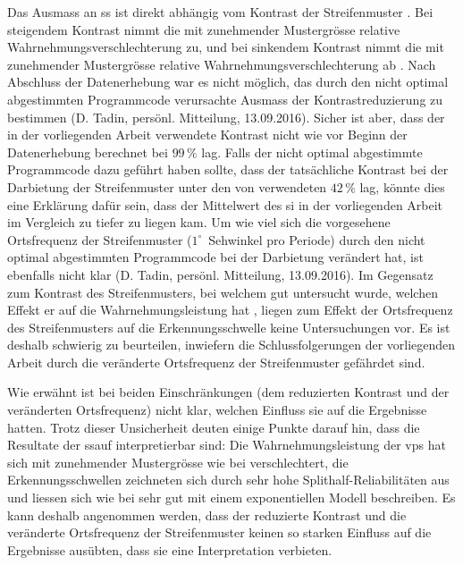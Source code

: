 \documentclass[11pt, twoside, a4paper]{book}		%
\begin{document}
Das Ausmass an \gls{ss} ist direkt abhängig vom Kontrast der Streifenmuster \citep{Tadin2003}. Bei steigendem Kontrast nimmt die mit zunehmender Mustergrösse relative Wahrnehmungsverschlechterung zu, und bei sinkendem Kontrast nimmt die mit zunehmender Mustergrösse relative Wahrnehmungsverschlechterung ab \citep{Tadin2003}. Nach Abschluss der Datenerhebung war es nicht möglich, das durch den nicht optimal abgestimmten Programmcode verursachte Ausmass der Kontrastreduzierung zu bestimmen (D. Tadin, persönl. Mitteilung, 13.09.2016). Sicher ist aber, dass der in der vorliegenden Arbeit verwendete Kontrast nicht wie vor Beginn der Datenerhebung berechnet bei $99\,\%$ lag. Falls der nicht optimal abgestimmte Programmcode dazu geführt haben sollte, dass der tatsächliche Kontrast bei der Darbietung der Streifenmuster unter den von \citet{Melnick2013} verwendeten $42\,\%$ lag, könnte dies eine Erklärung dafür sein, dass der Mittelwert des \gls{si} in der vorliegenden Arbeit im Vergleich zu \citeauthor{Melnick2013} tiefer zu liegen kam.
Um wie viel sich die vorgesehene Ortsfrequenz der Streifenmuster ($1^{\circ}$~Sehwinkel pro Periode) durch den nicht optimal abgestimmten Programmcode bei der Darbietung verändert hat, ist ebenfalls nicht klar (D. Tadin, persönl. Mitteilung, 13.09.2016). Im Gegensatz zum Kontrast des Streifenmusters, bei welchem gut untersucht wurde, welchen Effekt er auf die Wahrnehmungsleistung hat \citep[][]{Tadin2003, Kapadia1999, Levitt1997, Pack2005}, liegen zum Effekt der Ortsfrequenz des Streifenmusters auf die Erkennungsschwelle keine Untersuchungen vor. Es ist deshalb schwierig zu beurteilen, inwiefern die Schlussfolgerungen der vorliegenden Arbeit durch die veränderte Ortsfrequenz der Streifenmuster gefährdet sind.

Wie erwähnt ist bei beiden Einschränkungen (dem reduzierten Kontrast und der veränderten Ortsfrequenz) nicht klar, welchen Einfluss sie auf die Ergebnisse hatten. Trotz dieser Unsicherheit deuten einige Punkte darauf hin, dass die Resultate der \gls{ssauf} interpretierbar sind: Die Wahrnehmungsleistung der \glspl{vp} hat sich mit zunehmender Mustergrösse wie bei \citet{Melnick2013} verschlechtert, die Erkennungsschwellen zeichneten sich durch sehr hohe Split\-half-Reliabilitäten aus und liessen sich wie bei \citeauthor{Melnick2013} sehr gut mit einem exponentiellen Modell beschreiben. 
Es kann deshalb angenommen werden, dass der reduzierte Kontrast und die veränderte Ortsfrequenz der Streifenmuster keinen so starken Einfluss auf die Ergebnisse ausübten, dass sie eine Interpretation verbieten.
\end{document}
